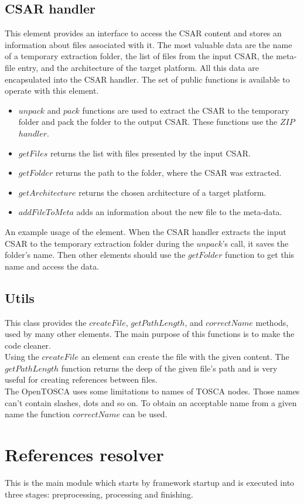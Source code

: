 \subsection*{CSAR handler}
This element provides an interface to access the CSAR content and stores an information about files associated with it.
The most valuable data are the name of a temporary extraction folder, the list of files from the input CSAR, the meta-file entry, and the architecture of the target platform.
All this data are encapsulated into the CSAR handler.
The set of public functions is available to operate with this element.
\begin{itemize}
	\item $unpack$ and $pack$ functions are used to extract the CSAR to the temporary folder and pack the folder to the output CSAR. 
	These functions use the $ZIP$~$handler$.
	\item $getFiles$ returns the list with files presented by the input CSAR.
	\item $getFolder$ returns the path to the folder, where the CSAR was extracted.
	\item $getArchitecture$ returns the chosen architecture of a target platform.
	\item $addFileToMeta$ adds an information about the new file to the meta-data.
\end{itemize}
An example usage of the element.
When the CSAR handler extracts the input CSAR to the temporary extraction folder during the $unpack$'s call, it saves the folder's name. 
Then other elements should use the $getFolder$ function to get this name and access the data.

\subsection*{Utils}
This class provides the $createFile$, $getPathLength$, and $correctName$ methods, used by many other elements.
The main purpose of this functions is to make the code cleaner. \\
Using the $createFile$ an element can create the file with the given content.
The $getPathLength$ function returns the deep of the given file's path and is very useful for creating references between files.\\
The OpenTOSCA uses some limitations to names of TOSCA nodes. 
Those names can't contain slashes, dots and so on.
To obtain an acceptable name from a given name the function $correctName$ can be used.

\section{References resolver}
This is the main module which starts by framework startup and is executed into three stages: preprocessing, processing and finishing.

